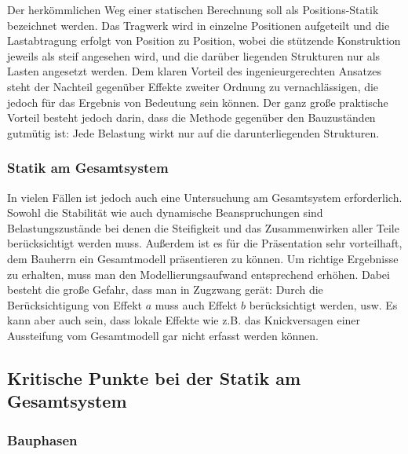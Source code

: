 Der herk\"{o}mmlichen Weg einer statischen Berechnung soll als Positions-Statik bezeichnet werden. Das Tragwerk wird in einzelne Positionen aufgeteilt und die Lastabtragung erfolgt von Position zu Position, wobei die st\"{u}tzende Konstruktion jeweils als steif angesehen wird, und die dar\"{u}ber liegenden Strukturen nur als Lasten angesetzt werden. Dem klaren Vorteil des ingenieurgerechten Ansatzes steht der Nachteil gegen\"{u}ber Effekte zweiter Ordnung zu vernachl\"{a}ssigen, die jedoch f\"{u}r das Ergebnis von Bedeutung sein k\"{o}nnen.  Der ganz gro{\ss}e praktische Vorteil besteht jedoch darin, dass die Methode gegen\"{u}ber den Bauzust\"{a}nden gutm\"{u}tig ist: Jede Belastung wirkt nur auf die darunterliegenden Strukturen.

{\textcolor{sectionTitleBlue}{\subsubsection*{Statik am Gesamtsystem}}}

In vielen F\"{a}llen ist jedoch auch eine Untersuchung am Gesamtsystem erforderlich. Sowohl die Stabilit\"{a}t wie auch dynamische Beanspruchungen sind Belastungszust\"{a}nde bei denen die Steifigkeit und das Zusammenwirken aller Teile ber\"{u}cksichtigt werden muss. Au{\ss}erdem ist es f\"{u}r die Pr\"{a}sentation sehr vorteilhaft, dem Bauherrn ein Gesamtmodell pr\"{a}sentieren zu k\"{o}nnen. Um richtige Ergebnisse zu erhalten, muss man den Modellierungsaufwand entsprechend erh\"{o}hen. Dabei besteht die gro{\ss}e Gefahr, dass man in Zugzwang ger\"{a}t: Durch die Ber\"{u}cksichtigung von Effekt $a$ muss auch Effekt $b$ ber\"{u}cksichtigt werden, usw. Es kann aber auch sein, dass lokale Effekte wie z.B. das Knickversagen einer Aussteifung vom Gesamtmodell gar nicht erfasst werden k\"{o}nnen.

{\textcolor{sectionTitleBlue}{\subsection{Kritische Punkte bei der Statik am Gesamtsystem}}}
\vspace{-0.3cm}
{\textcolor{sectionTitleBlue}{\subsubsection*{Bauphasen}}}

